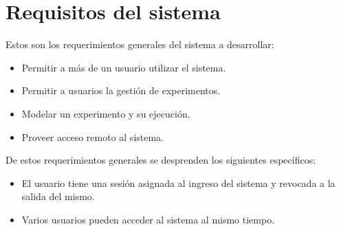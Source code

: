 \section{Requisitos del sistema}

Estos son los requerimientos generales del sistema a desarrollar:

\begin{itemize}
\item Permitir a m\'as de un usuario utilizar el sistema.
\item Permitir a usuarios la gesti\'on de experimentos.
\item Modelar un experimento y su ejecuci\'on.
\item Proveer acceso remoto al sistema.
\end{itemize}
\noindent
De estos requerimientos generales se desprenden los siguientes espec\'ificos:

\begin{itemize}
\item El usuario tiene una sesi\'on asignada al ingreso del sistema y revocada a la salida del mismo.
\item Varios usuarios pueden acceder al sistema al mismo tiempo.
\end{itemize}

